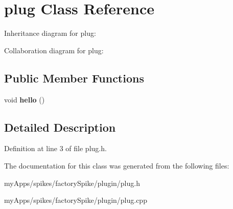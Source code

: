 \hypertarget{classplug}{}\section{plug Class Reference}
\label{classplug}


Inheritance diagram for plug\+:


Collaboration diagram for plug\+:
\subsection*{Public Member Functions}
\begin{DoxyCompactItemize}
\item 
\mbox{\label{classplug_aad2b724328ce1753af082dd0eda23a8d}} 
void {\bfseries hello} ()
\end{DoxyCompactItemize}


\subsection{Detailed Description}


Definition at line 3 of file plug.\+h.



The documentation for this class was generated from the following files\+:\begin{DoxyCompactItemize}
\item 
my\+Apps/spikes/factory\+Spike/plugin/plug.\+h\item 
my\+Apps/spikes/factory\+Spike/plugin/plug.\+cpp\end{DoxyCompactItemize}
